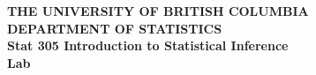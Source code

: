 \onehalfspace

\begin{center}
\large\textbf{THE UNIVERSITY OF BRITISH COLUMBIA}\\
\large\textbf{DEPARTMENT OF STATISTICS}\\
\large\textbf{Stat 305 Introduction to Statistical Inference}\\
\large\textbf{Lab \labnr {}}
\end{center}

